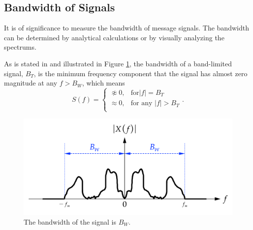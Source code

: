 \documentclass[../ECE459FinalProjectReport.tex]{subfiles}
\begin{document}
\subsection{Bandwidth of Signals}
It is of significance to measure the bandwidth of message signals. The bandwidth can be determined by analytical calculations or by visually analyzing the spectrums.

As is stated in \cite[Sec. 7.2.3]{kudekiAnalogSignalsSystems2009} and illustrated in Figure \ref{fig:bw}, the bandwidth of a band-limited signal, $B_T$, is the minimum frequency component that the signal has almost zero magnitude at any $f>B_W$, which means
\begin{equation}\label{eq:bw-def}
    S\left( f \right) =
    \begin{cases}
        \napprox 0, & \text{for} \left| f \right|=B_T      \\
        \approx 0,  & \text{for any }\left| f \right| >B_T \\
    \end{cases}.
\end{equation}

\begin{figure}[tb]
    \centering
    \includegraphics[scale=.5]{plots/bw.pdf}
    \caption{The bandwidth of the signal is $B_W$.}
    \label{fig:bw}
\end{figure}
\end{document}
